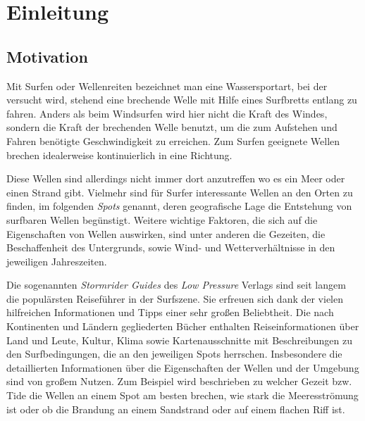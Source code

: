 
\section{Einleitung}

\subsection{Motivation}

Mit Surfen oder Wellenreiten bezeichnet man eine Wassersportart, bei
der versucht wird, stehend eine brechende Welle mit Hilfe eines
Surfbretts entlang zu fahren. Anders als beim Windsurfen wird hier
nicht die Kraft des Windes, sondern die Kraft der brechenden Welle
benutzt, um die zum Aufstehen und Fahren benötigte Geschwindigkeit zu
erreichen. Zum Surfen geeignete Wellen brechen idealerweise
kontinuierlich in eine Richtung.

Diese Wellen sind allerdings nicht immer dort anzutreffen wo es ein
Meer oder einen Strand gibt. Vielmehr sind für Surfer interessante
Wellen an den Orten zu finden, im folgenden \textit{Spots} genannt,
deren geografische Lage die Entstehung von surfbaren Wellen
begünstigt. Weitere wichtige Faktoren, die sich auf die Eigenschaften
von Wellen auswirken, sind unter anderen die Gezeiten, die
Beschaffenheit des Untergrunds, sowie Wind- und Wetterverhältnisse in
den jeweiligen Jahreszeiten.

Die sogenannten \textit{Stormrider Guides} \cite{storm_2007} des
\textit{Low Pressure} Verlags sind seit langem die populärsten
Reiseführer in der Surfszene. Sie erfreuen sich dank der vielen
hilfreichen Informationen und Tipps einer sehr großen Beliebtheit. Die
nach Kontinenten und Ländern gegliederten Bücher enthalten
Reiseinformationen über Land und Leute, Kultur, Klima sowie
Kartenausschnitte mit Beschreibungen zu den Surfbedingungen, die an
den jeweiligen Spots herrschen. Insbesondere die detaillierten
Informationen über die Eigenschaften der Wellen und der Umgebung sind
von großem Nutzen. Zum Beispiel wird beschrieben zu welcher Gezeit
bzw. Tide die Wellen an einem Spot am besten brechen, wie stark die
Meeresströmung ist oder ob die Brandung an einem Sandstrand oder auf
einem flachen Riff ist.

